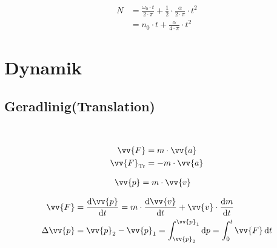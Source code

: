 \begin{boxleft}
\end{boxleft}\begin{boxrightshaded}
\begin{align}
N	&=\frac{\omega_0\cdot t}{2\cdot \pi}+\frac{1}{2}\cdot\frac{\alpha}{2\cdot \pi}\cdot t^2\\
	&=n_0\cdot t+\frac{\alpha}{4\cdot\pi}\cdot t^2
\end{align}
\end{boxrightshaded}

\section{Dynamik}
\subsection{Geradlinig(Translation)}
\begin{boxleft}
\\
\end{boxleft}\begin{boxrightshaded}
\begin{align}
\vv{F}&=m\cdot \vv{a}\\
\vv{F}_{\text{Tr}}&=-m\cdot \vv{a}
\end{align}
\end{boxrightshaded}

\begin{boxleft}
\end{boxleft}\begin{boxrightshaded}
\begin{align}
\vv{p}&=m\cdot \vv{v}
\end{align}
\end{boxrightshaded}

\begin{boxleft}
\end{boxleft}\begin{boxrightshaded}
\begin{align}
\vv{F}&=\frac{\diff \vv{p}}{\diff t}=m\cdot\frac{\diff \vv{v}}{\diff t}+\vv{v}\cdot\frac{\diff m}{\diff t}\\
\Delta\vv{p}&=\vv{p}_2-\vv{p}_1=\int_{\vv{p}_2}^{\vv{p}_1}\diff p=\int_0^{t}\vv{F}\diff t
\end{align}
\end{boxrightshaded}

